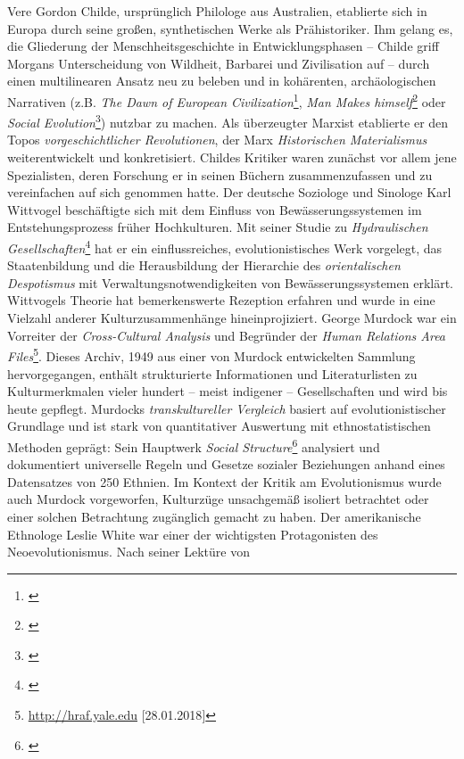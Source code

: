 \documentclass[openany,twoside,twocolumn]{book}
\let\rmarkdownfootnote\footnote%
\def\footnote{\protect\rmarkdownfootnote}
\begin{document}
Vere Gordon Childe, ursprünglich Philologe aus Australien, etablierte
sich in Europa durch seine großen, synthetischen Werke als
Prähistoriker. Ihm gelang es, die Gliederung der Menschheitsgeschichte
in Entwicklungsphasen -- Childe griff Morgans Unterscheidung von
Wildheit, Barbarei und Zivilisation auf -- durch einen multilinearen
Ansatz neu zu beleben und in kohärenten, archäologischen Narrativen
(z.B. \emph{The Dawn of European Civilization}\footnote{\textcite{childe_dawn_1925}},
\emph{Man Makes himself}\footnote{\textcite{childe_man_1936}} oder
\emph{Social Evolution}\footnote{\textcite{childe_social_1951}}) nutzbar
zu machen. Als überzeugter Marxist etablierte er den Topos
\emph{vorgeschichtlicher Revolutionen}, der Marx \emph{Historischen
Materialismus} weiterentwickelt und konkretisiert. Childes Kritiker
waren zunächst vor allem jene Spezialisten, deren Forschung er in seinen
Büchern zusammenzufassen und zu vereinfachen auf sich genommen hatte.
Der deutsche Soziologe und Sinologe Karl Wittvogel beschäftigte sich mit
dem Einfluss von Bewässerungssystemen im Entstehungsprozess früher
Hochkulturen. Mit seiner Studie zu \emph{Hydraulischen
Gesellschaften}\footnote{\textcite{wittfogel_oriental_1957}} hat er ein
einflussreiches, evolutionistisches Werk vorgelegt, das Staatenbildung
und die Herausbildung der Hierarchie des \emph{orientalischen
Despotismus} mit Verwaltungsnotwendigkeiten von Bewässerungssystemen
erklärt. Wittvogels Theorie hat bemerkenswerte Rezeption erfahren und
wurde in eine Vielzahl anderer Kulturzusammenhänge hineinprojiziert.
George Murdock war ein Vorreiter der \emph{Cross-Cultural Analysis} und
Begründer der \emph{Human Relations Area Files}\footnote{\url{http://hraf.yale.edu}
  {[}28.01.2018{]}}. Dieses Archiv, 1949 aus einer von Murdock
entwickelten Sammlung hervorgegangen, enthält strukturierte
Informationen und Literaturlisten zu Kulturmerkmalen vieler hundert --
meist indigener -- Gesellschaften und wird bis heute gepflegt. Murdocks
\emph{transkultureller Vergleich} basiert auf evolutionistischer
Grundlage und ist stark von quantitativer Auswertung mit
ethnostatistischen Methoden geprägt: Sein Hauptwerk \emph{Social
Structure}\footnote{\textcite{murdock_social_1949}} analysiert und
dokumentiert universelle Regeln und Gesetze sozialer Beziehungen anhand
eines Datensatzes von 250 Ethnien. Im Kontext der Kritik am
Evolutionismus wurde auch Murdock vorgeworfen, Kulturzüge unsachgemäß
isoliert betrachtet oder einer solchen Betrachtung zugänglich gemacht zu
haben. Der amerikanische Ethnologe Leslie White war einer der
wichtigsten Protagonisten des Neoevolutionismus. Nach seiner Lektüre von
\end{document}
